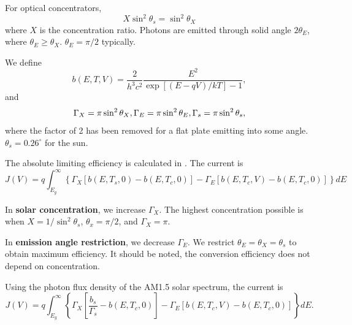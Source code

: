 \documentclass[12pt]{article}
\begin{document}
For optical concentrators, 
\begin{equation}
X \sin^2{\theta_s} = \sin^2{\theta_X}
\end{equation}
where $X$ is the concentration ratio. 
Photons are emitted through solid angle $2 \theta_E$, where $\theta_E \geq \theta_X$.  $\theta_E = \pi/2$ typically.


We define
\begin{equation}
b (E, T, V) = \frac{2}{h^3 c^2} \frac{E^2}{\exp\left [(E-qV)/kT \right ] - 1}, 
\end{equation}
and
\begin{equation}
\Gamma_X = \pi \sin^2 \theta_X, \\
\Gamma_E = \pi \sin^2 \theta_E,
\Gamma_s = \pi \sin^2 \theta_s,
\end{equation}
where the factor of 2 has been removed for a flat plate emitting into some angle.  $\theta_s = 0.26^{\circ}$ for the sun.  

The absolute limiting efficiency is calculated in \cite{Araujo:94}.  
The current is
\begin{equation}
J(V) = q \int_{E_g}^{\infty} \left \{ \Gamma_X \left [ b (E, T_s,0) - b(E, T_c, 0) \right ] - \Gamma_E  \left [ b(E, T_c, V)  - b(E, T_c, 0) \right ]  \right \}  dE
\end{equation}

In \textbf{solar concentration}, we increase $\Gamma_X$.   The highest concentration possible is when $X = 1/\sin^{2} \theta_s$, $\theta_x = \pi/2$, and $\Gamma_X = \pi$.   

In \textbf{emission angle restriction}, we decrease $\Gamma_E$.   We restrict $\theta_E = \theta_X = \theta_s$ to obtain maximum efficiency.  It should be noted, the conversion efficiency does not depend on concentration.     


Using the photon flux density of the AM1.5 solar spectrum, the current is
\begin{equation}
J(V) = q \int_{E_g}^{\infty} \left \{ \Gamma_X \left [ \frac{b_s}{\Gamma_s} -  b(E, T_c, 0) \right ] - \Gamma_E  \left [ b(E, T_c, V)  - b(E, T_c, 0) \right ]  \right \}  dE.
\end{equation}
\end{document}
